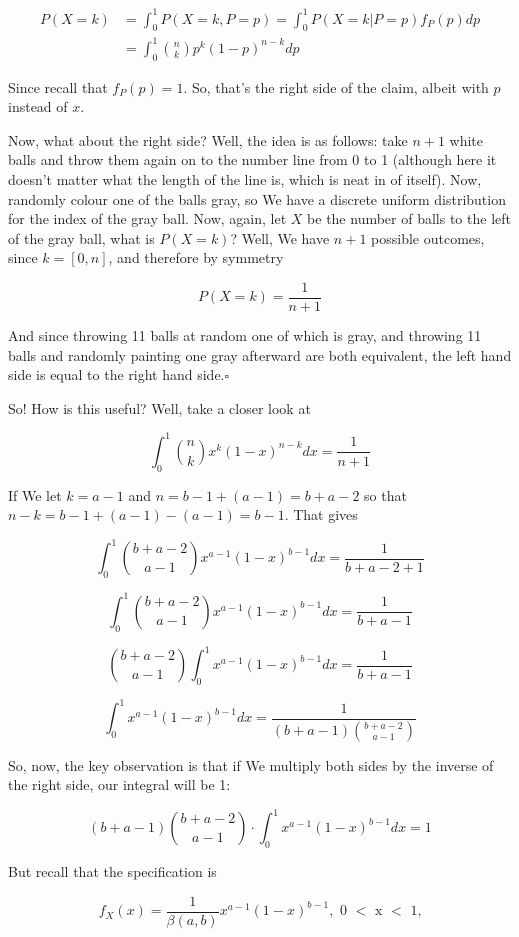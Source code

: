 \documentclass{article}
\newcommand{\qed}{\hfill$\square$}
\begin{document}
		\begin{align*}
		P(X=k) &= \int_0^1 P(X=k, P=p) = \int^1_0 P(X=k|P=p)f_P(p) dp \\
		&= \int^1_0 {n\choose k}p^k(1-p)^{n-k}dp
		\end{align*}
		
		Since recall that $f_P(p) = 1$. So, that's the right side of the claim, albeit with $p$ instead of $x$.
		
		Now, what about the right side? Well, the idea is as follows: take $n+1$ white balls and throw them again on to the number line from 0 to 1 (although here it doesn't matter what the length of the line is, which is neat in of itself). Now, randomly colour one of the balls gray, so We have a discrete uniform distribution for the index of the gray ball. Now, again, let $X$ be the number of balls to the left of the gray ball, what is $P(X=k)$? Well, We have $n+1$ possible outcomes, since $k=[0, n]$, and therefore by symmetry
		
		\[ P(X=k) = \frac{1}{n+1} \]
		
		And since throwing 11 balls at random one of which is gray, and throwing 11 balls and randomly painting one gray afterward are both equivalent, the left hand side is equal to the right hand side.\qed
		
		So! How is this useful? Well, take a closer look at 
		
		\[ \int^1_0 {n\choose k}x^k(1-x)^{n-k}dx = \frac{1}{n+1} \]
		
		If We let $k=a-1$ and $n = b-1 + (a-1) = b+a-2$ so that $n-k = b-1 + (a-1) - (a-1) = b-1$. That gives
		
		\[ \int^1_0 {b+a-2\choose a-1}x^{a-1}(1-x)^{b-1}dx = \frac{1}{b+a-2+1} \]
		
		\[ \int^1_0 {b+a-2\choose a-1}x^{a-1}(1-x)^{b-1}dx = \frac{1}{b+a-1} \]
		
		\[ {b+a-2\choose a-1}\int^1_0 x^{a-1}(1-x)^{b-1}dx = \frac{1}{b+a-1} \]
		
		\[ \int^1_0 x^{a-1}(1-x)^{b-1}dx = \frac{1}{(b+a-1){b+a-2\choose a-1}} \]
		
		So, now, the key observation is that if We multiply both sides by the inverse of the right side, our integral will be 1:
		
		\[ (b+a-1){b+a-2\choose a-1}\cdot \int^1_0 x^{a-1}(1-x)^{b-1}dx  = 1 \]
		
		But recall that the specification is 
		
		\[ f_X(x) = \frac{1}{\beta(a, b)}x^{a-1}(1-x)^{b-1}, \text{ 0 $<$ x $<$ 1,} \]
		
\end{document}
